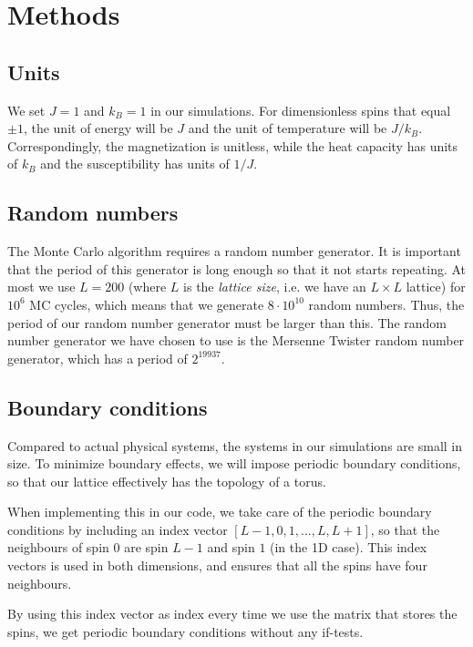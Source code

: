 \documentclass[%
 reprint,
nofootinbib,
aps,
]{revtex4-1}
\begin{document}
\section{Methods}

\subsection{Units}

We set $J = 1$ and $k_B = 1$ in our simulations. For dimensionless spins that equal $\pm 1$, the unit of energy will be $J$ and the unit of temperature will be $J/k_B$. Correspondingly, the magnetization is unitless, while the heat capacity has units of $k_B$ and the susceptibility has units of $1/J$.



\subsection{Random numbers}

The Monte Carlo algorithm requires a random number generator. It is important that the period of this generator is long enough so that it not starts repeating. At most we use $L = 200$ (where $L$ is the \textit{lattice size}, i.e. we have an $L \times L$ lattice) for $10^6$ MC cycles, which means that we generate $8\cdot 10^{10}$ random numbers. Thus, the period of our random number generator must be larger than this. The random number generator we have chosen to use is the Mersenne Twister random number generator, which has a period of $2^{19937}$.


\subsection{Boundary conditions}

Compared to actual physical systems, the systems in our simulations are small in size. To minimize boundary effects, we will impose periodic boundary conditions, so that our lattice effectively has the topology of a torus. 

When implementing this in our code, we take care of the periodic boundary conditions by including an index vector $[L-1, 0, 1, ..., L, L+1]$, so that the neighbours of  spin $0$ are spin $L-1$ and spin $1$ (in the 1D case). This index vectors is used in both dimensions, and ensures that all the spins have four neighbours. 

By using this index vector as index every time we use the matrix that stores the spins, we get periodic boundary conditions without any if-tests.
\end{document}
